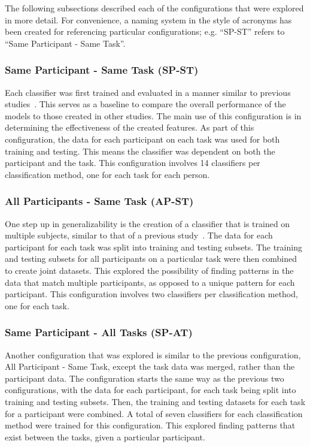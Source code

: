 \documentclass[11pt]{article}
\begin{document}
	The following subsections described each of the configurations that were explored in more detail. For convenience, a naming system in the style of acronyms has been created for referencing particular configurations; e.g. ``SP-ST'' refers to ``Same Participant - Same Task''.
		
		\subsubsection{Same Participant - Same Task (SP-ST)}
		Each classifier was first trained and evaluated in a manner similar to previous studies~\cite{Wilson, Zhang, Wang_R, Yin}. This serves as a baseline to compare the overall performance of the models to those created in other studies. The main use of this configuration is in determining the effectiveness of the created features. As part of this configuration, the data for each participant on each task was used for both training and testing. This means the classifier was dependent on both the participant and the task. This configuration involves 14 classifiers per classification method, one for each task for each person.
		 
		\subsubsection{All Participants - Same Task (AP-ST)}
		One step up in generalizability is the creation of a classifier that is trained on multiple subjects, similar to that of a previous study~\cite{Wang_Z}. The data for each participant for each task was split into training and testing subsets. The training and testing subsets for all participants on a particular task were then combined to create joint datasets. This explored the possibility of finding patterns in the data that match multiple participants, as opposed to a unique pattern for each participant. This configuration involves two classifiers per classification method, one for each task.
		
		\subsubsection{Same Participant - All Tasks (SP-AT)}
		Another configuration that was explored is similar to the previous configuration, All Participant - Same Task, except the task data was merged, rather than the participant data. The configuration starts the same way as the previous two configurations, with the data for each participant, for each task being split into training and testing subsets. Then, the training and testing datasets for each task for a participant were combined. A total of seven classifiers for each classification method were trained for this configuration. This explored finding patterns that exist between the tasks, given a particular participant.
		
\end{document}

